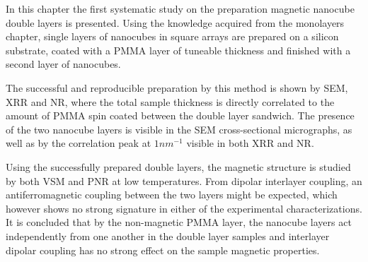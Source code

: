 \documentclass[\main/dresen_thesis.tex]{subfiles}
\begin{document}
  In this chapter the first systematic study on the preparation magnetic nanocube double layers is presented.
  Using the knowledge acquired from the monolayers chapter, single layers of nanocubes in square arrays are prepared on a silicon substrate, coated with a PMMA layer of tuneable thickness and finished with a second layer of nanocubes.

  The successful and reproducible preparation by this method is shown by SEM, XRR and NR, where the total sample thickness is directly correlated to the amount of PMMA spin coated between the double layer sandwich.
  The presence of the two nanocube layers is visible in the SEM cross-sectional micrographs, as well as by the correlation peak at $1 \unit{nm^{-1}}$ visible in both XRR and NR.

  Using the successfully prepared double layers, the magnetic structure is studied by both VSM and PNR at low temperatures.
  From dipolar interlayer coupling, an antiferromagnetic coupling between the two layers might be expected, which however shows no strong signature in either of the experimental characterizations.
  It is concluded that by the non-magnetic PMMA layer, the nanocube layers act independently from one another in the double layer samples and interlayer dipolar coupling has no strong effect on the sample magnetic properties.
\end{document}
